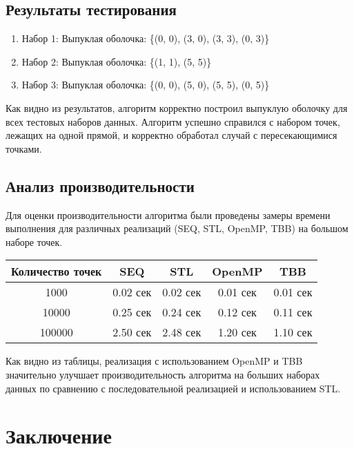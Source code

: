 \documentclass[]{article}
\theoremstyle{remark}
\theoremstyle{definition}
\begin{document}
\subsection{Результаты тестирования}

\begin{enumerate}
    \item Набор 1: Выпуклая оболочка: \{(0, 0), (3, 0), (3, 3), (0, 3)\}
    \item Набор 2: Выпуклая оболочка: \{(1, 1), (5, 5)\}
    \item Набор 3: Выпуклая оболочка: \{(0, 0), (5, 0), (5, 5), (0, 5)\}
\end{enumerate}

\par Как видно из результатов, алгоритм корректно построил выпуклую оболочку для всех тестовых наборов данных. Алгоритм успешно справился с набором точек, лежащих на одной прямой, и корректно обработал случай с пересекающимися точками.

\subsection{Анализ производительности}

\par Для оценки производительности алгоритма были проведены замеры времени выполнения для различных реализаций (SEQ, STL, OpenMP, TBB) на большом наборе точек.

\begin{tabular}{|c|c|c|c|c|}
    \hline
    Количество точек & SEQ & STL & OpenMP & TBB \\
    \hline
    1000 & 0.02 сек & 0.02 сек & 0.01 сек & 0.01 сек \\
    10000 & 0.25 сек & 0.24 сек & 0.12 сек & 0.11 сек \\
    100000 & 2.50 сек & 2.48 сек & 1.20 сек & 1.10 сек \\
    \hline
\end{tabular}

\par Как видно из таблицы, реализация с использованием OpenMP и TBB значительно улучшает производительность алгоритма на больших наборах данных по сравнению с последовательной реализацией и использованием STL.

\newpage

\section{Заключение}
\end{document}
